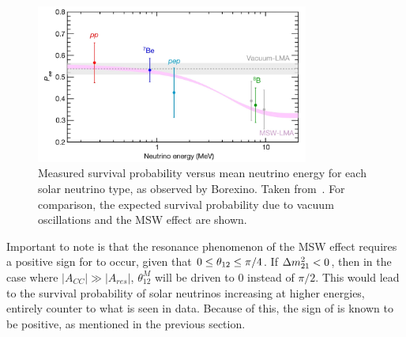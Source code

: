 \begin{figure}
    \centering
    \includegraphics[width=0.8\textwidth]{1_NeutrinoTheory/Figs/borexino_pee_energy_plot.png}
    \caption[Measured survival probability versus mean neutrino energy for each solar neutrino type, as observed by Borexino]{Measured survival probability versus mean neutrino energy for each solar neutrino type, as observed by Borexino. Taken from~\cite{agostiniComprehensiveMeasurementPpchain2018}. For comparison, the expected survival probability due to vacuum oscillations and the MSW effect are shown.}
    \label{fig:pee_solar_data}
\end{figure}

Important to note is that the resonance phenomenon of the MSW effect requires a positive sign for \dmsq{} to occur, given that $0\leq\theta_{12}{}\leq\pi/4$. If $\Delta m^{2}_{21}{}<0$, then in the case where $|A_{CC}|\gg |A_{res}|$, $\theta_{12}^{M}$ will be driven to 0 instead of $\pi/2$. This would lead to the survival probability of solar neutrinos increasing at higher energies, entirely counter to what is seen in data. Because of this, the sign of \dmsq{} is known to be positive, as mentioned in the previous section.


